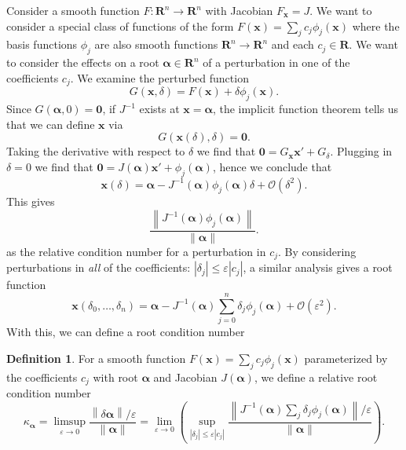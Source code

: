 \documentclass[3p, authoryear, square]{elsarticle}
\theoremstyle{definition}
\newtheorem{definition}{Definition}[section]
\newcommand{\reals}{\mathbf{R}}
\newcommand{\bigO}[1]{\mathcal{O}\left(#1\right)}
\newcommand{\eps}{\varepsilon}
\begin{document}
Consider a smooth function \(F: \reals^n \longrightarrow \reals^n\)
with Jacobian \(F_{\bm{x}} = J\). We want to consider a special class of
functions of the form \(F\left(\bm{x}\right) = \sum_j c_j
\phi_j\left(\bm{x}\right)\) where the basis
functions \(\phi_j\) are also smooth functions
\(\reals^n \longrightarrow \reals^n\)
and each \(c_j \in \reals\). We want to consider the effects on a root
\(\bm{\alpha} \in \reals^n\) of a perturbation in one of the
coefficients \(c_j\). We examine the perturbed function
\begin{equation}
G\left(\bm{x}, \delta\right) = F\left(\bm{x}\right) +
\delta \phi_j\left(\bm{x}\right).
\end{equation}
Since \(G\left(\bm{\alpha}, 0\right) = \bm{0}\), if \(J^{-1}\) exists at
\(\bm{x} = \bm{\alpha}\),
the implicit function theorem tells us that we can define
\(\bm{x}\) via
\begin{equation}
G\left(\bm{x}\left(\delta\right), \delta\right) = \bm{0}.
\end{equation}
Taking the derivative with respect to \(\delta\) we find that
\(\bm{0} = G_{\bm{x}} \bm{x}' + G_{\delta}\). Plugging in
\(\delta = 0\) we find that \(\bm{0} = J\left(\bm{\alpha}\right) \bm{x}' +
\phi_j\left(\bm{\alpha}\right)\), hence we
conclude that
\begin{equation}
\bm{x}\left(\delta\right) = \bm{\alpha} - J^{-1}\left(\bm{\alpha}\right)
  \phi_j\left(\bm{\alpha}\right) \delta + \bigO{\delta^2}.
\end{equation}
This gives
\begin{equation}
\frac{\left \lVert J^{-1}\left(\bm{\alpha}\right)
  \phi_j\left(\bm{\alpha}\right) \right \rVert}{
  \left \lVert \bm{\alpha} \right \rVert}.
\end{equation}
as the relative condition number for a perturbation in \(c_j\).
By considering perturbations in \emph{all} of the coefficients:
\(\left|\delta_j\right| \leq \eps \left|c_j\right|\), a similar analysis
gives a root function
\begin{equation}
\bm{x}\left(\delta_0, \ldots, \delta_n\right) = \bm{\alpha} -
  J^{-1}\left(\bm{\alpha}\right) \sum_{j = 0}^n \delta_j
  \phi_j\left(\bm{\alpha}\right) + \bigO{\eps^2}.
\end{equation}
With this, we can define a root condition number

\begin{definition}\label{defn:abstract-cond-num}
For a smooth function \(F\left(\bm{x}\right) = \sum_j c_j
\phi_j\left(\bm{x}\right)\) parameterized by the coefficients
\(c_j\) with root \(\bm{\alpha}\) and Jacobian
\(J\left(\bm{\alpha}\right)\), we define a relative root condition
number
\begin{equation}
\kappa_{\bm{\alpha}} =
  \limsup_{\eps \to 0} \frac{\left \lVert\delta \bm{\alpha}
  \right \rVert / \eps}{\left \lVert\bm{\alpha}\right \rVert} =
  \lim_{\eps \to 0} \left(\sup_{\left|\delta_j\right| \leq
  \eps \left|c_j\right|} \frac{\left \lVert
  J^{-1}\left(\bm{\alpha}\right) \sum_j \delta_j
  \phi_j\left(\bm{\alpha}\right) \right \rVert / \eps}{
  \left \lVert\bm{\alpha}\right \rVert}\right).
\end{equation}
\end{definition}
\end{document}
